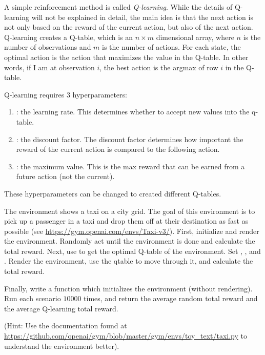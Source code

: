 A simple reinforcement method is called \emph{Q-learning}.
While the details of Q-learning will not be explained in detail, the main idea is that the next action is not only based on the reward of the current action, but also of the next action.
Q-learning creates a Q-table, which is an $n\times m$ dimensional array, where $n$ is the number of observations and $m$ is the number of actions.
For each state, the optimal action is the action that maximizes the value in the Q-table.
In other words, if I am at observation $i$, the best action is the argmax of row $i$ in the Q-table.

Q-learning requires 3 hyperparameters:
\begin{enumerate}
\item {}: the learning rate. This determines whether to accept new values into the q-table.
\item {}: the discount factor. The discount factor determines how important the reward of the current action is compared to the following action.
\item {}: the maximum value. This is the max reward that can be earned from a future action (not the current).
\end{enumerate}
These hyperparameters can be changed to created different Q-tables.

\begin{problem}
The environment  shows a taxi on a city grid.
The goal of this environment is to pick up a passenger in a taxi and drop them off at their destination as fast as possible (see \url{https://gym.openai.com/envs/Taxi-v3/}).
First, initialize and render the environment. Randomly act until the environment is done and calculate the total reward.
Next, use  to get the optimal Q-table of the environment.
Set , , and .
Render the environment, use the qtable to move through it, and calculate the total reward.

Finally, write a function  which initializes the  environment (without rendering).
Run each scenario $10000$ times, and return the average random total reward and the average Q-learning total reward.

(Hint: Use the documentation found at \url{https://github.com/openai/gym/blob/master/gym/envs/toy_text/taxi.py} to understand the environment better).
\label{prob:taxi}
\end{problem}
